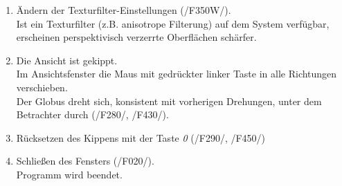 \documentclass[10pt]{scrreprt}
\newcommand{\ziel}[1]{{\fontsize{9.5}{11}\textsf{/#1/}}}
\newcommand{\ziellabel}{Z}
\newcommand{\muss}{\renewcommand{\labelenumi}{\textbf{\ziel{\ziellabel\numprint{\theenumi}0}}}}
\begin{document}
\begin{enumerate}[leftmargin = 2.2cm, resume]
\item Ändern der Texturfilter-Einstellungen (\ziel{F350W}).\\Ist ein Texturfilter (z.B. anisotrope Filterung) auf dem System verfügbar, erscheinen perspektivisch verzerrte Oberflächen schärfer.
\muss
\item Die Ansicht ist gekippt.\\Im Ansichtsfenster die Maus mit gedrückter linker Taste in alle Richtungen verschieben.\\Der Globus dreht sich, konsistent mit vorherigen Drehungen, unter dem Betrachter durch (\ziel{F280}, \ziel{F430}).
\item Rücksetzen des Kippens mit der Taste \textit{0} (\ziel{F290}, \ziel{F450})
\item Schließen des Fensters (\ziel{F020}).\\Programm wird beendet.
\end{enumerate}
\end{document}
